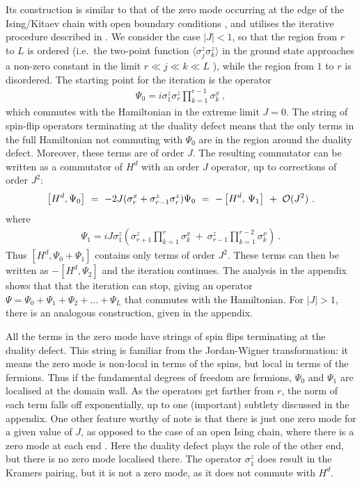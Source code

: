 \documentclass[11pt]{article}
\numberwithin{equation}{section}		%
\begin{document}
Its construction is similar to that of the zero mode occurring at the edge of the Ising/Kitaev chain with open boundary conditions \cite{Kitaev2001}, and utilises the iterative procedure described in \cite{Fendley2015}. We consider the case $|J|<1$, so that the region from $r$ to $L$ is ordered (i.e.\ the two-point function $\langle\sigma_j^z\sigma_k^z\rangle$ in the ground state approaches a non-zero constant in the limit $r\ll j\ll k\ll L$ ), while the region from $1$ to $r$ is disordered. The starting point for the iteration is the operator 
\begin{align} \Psi_0=i\sigma^z_1\sigma^z_r \prod_{k=1}^{r-1} \sigma^x_k\ ,
\label{psi0}
\end{align}
which commutes with the Hamiltonian in the extreme limit $J=0$. The string of spin-flip operators terminating at the duality defect means that the only terms in the full Hamiltonian not commuting with $\Psi_0$ are in the region around the duality defect. Moreover, these terms are of order $J$. The resulting commutator can be written as a commutator of $H^d$ with an order $J$ operator, up to corrections of order $J^2$:
\begin{align}
\left[H^d,\Psi_0\right]\ =\ -2J(\sigma^x_r+\sigma^z_{r-1}\sigma^z_{r})\Psi_0
 \ =\ -\left[H^d,\,\Psi_1\right]\ +\ {\cal O}(J^2)\ .
\end{align}
where
\begin{align}
\Psi_1=  iJ\sigma^z_1\left(\sigma^z_{r+1} \prod_{k=1}^{r} \sigma^x_k\  +\ \sigma^z_{r-1}\prod_{k=1}^{r-2} \sigma^x_k\right)\ .
\end{align}
Thus $[H^d,\Psi_0+\Psi_1]$ contains only terms of order $J^2$. These terms can then be written as $-[H^d,\Psi_2]$ and the iteration continues. The analysis in the appendix shows that that the iteration can stop, giving an operator $\Psi=\Psi_0+\Psi_1+\Psi_2+\dots+\Psi_{L}$ that commutes with the Hamiltonian. 
For $|J|>1$, there is an analogous construction, given in the appendix.

All the terms in the zero mode have strings of spin flips terminating at the duality defect. This string is familiar from the Jordan-Wigner transformation: it means the zero mode is non-local in terms of the spins, but local in terms of the fermions. Thus if the fundamental degrees of freedom are fermions, $\Psi_0$ and $\Psi_1$ are localised at the domain wall. As the operators get farther from $r$,  the norm of each term falls off exponentially, up to one (important) subtlety discussed in the appendix. One other feature worthy of note is that there is just one zero mode for a given value of $J$, as opposed to the case of an open Ising chain, where there is a zero mode at each end \cite{Kitaev2001}. Here the duality defect plays the role of the other end, but there is no zero mode localised there. The operator $\sigma^z_1$ does result in the Kramers pairing, but it is not a zero mode, as it does not commute with $H^d$.  
\end{document}
